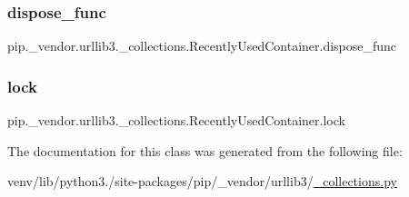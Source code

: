 \subsubsection{\texorpdfstring{dispose\+\_\+func}{dispose\_func}}
{\footnotesize\ttfamily pip.\+\_\+vendor.\+urllib3.\+\_\+collections.\+Recently\+Used\+Container.\+dispose\+\_\+func}

\mbox{\label{classpip_1_1__vendor_1_1urllib3_1_1__collections_1_1RecentlyUsedContainer_a52296cd6452d0b736b5099f93d5e739f}} 
\subsubsection{\texorpdfstring{lock}{lock}}
{\footnotesize\ttfamily pip.\+\_\+vendor.\+urllib3.\+\_\+collections.\+Recently\+Used\+Container.\+lock}



The documentation for this class was generated from the following file\+:\begin{DoxyCompactItemize}
\item 
venv/lib/python3./site-\/packages/pip/\+\_\+vendor/urllib3/\hyperlink{__collections_8py}{\+\_\+collections.\+py}\end{DoxyCompactItemize}
